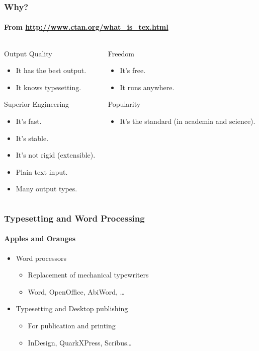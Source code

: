 \begin{frame}
\frametitle{Why?}
\framesubtitle{From \url{http://www.ctan.org/what_is_tex.html}}
\begin{columns}[T]
\begin{column}{.46\textwidth}
\begin{block}{Output Quality}
\begin{itemize}
\item It has the best output.
\item It knows typesetting.
\end{itemize}
\end{block}

\begin{block}{Superior Engineering}
\begin{itemize}
\item It's fast.
\item It's stable.
\item It's not rigid (extensible).
\item Plain text input.
\item Many output types.
\end{itemize}
\end{block}
\end{column}

\begin{column}{.46\textwidth}
\begin{block}{Freedom}
\begin{itemize}
\item It's free.
\item It runs anywhere.
\end{itemize}
\end{block}

\begin{block}{Popularity}
\begin{itemize}
\item It's the standard (in academia and science).
\end{itemize}
\end{block}
\end{column}
\end{columns}
\end{frame}

\begin{frame}
\frametitle{Typesetting and Word Processing}
\framesubtitle{Apples and Oranges}
\begin{itemize}
\item<+-> Word processors
\begin{itemize}
\item Replacement of mechanical typewriters
\item Word, OpenOffice, AbiWord, \ldots
\end{itemize}
\item<+-> Typesetting and Desktop publishing
\begin{itemize}
\item For publication and printing
\item InDesign, QuarkXPress, Scribus\ldots
\end{itemize}
\end{itemize}
\end{frame}

